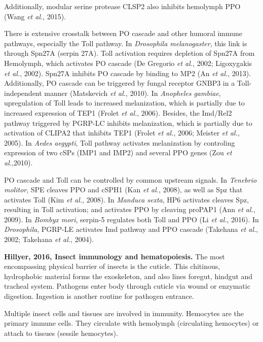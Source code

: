 \documentclass[11pt]{article}
\begin{document}
\begin{sloppypar}
Additionally, modular serine protease CLSP2 also inhibits hemolymph PPO (Wang \textit{et al.}, 2015).
\par
There is extensive crosstalk between PO cascade and other humoral immune pathways, especially the Toll pathway. 
In \textit{Drosophila melanogaster}, this link is through Spn27A (serpin 27A). 
Toll activation requires depletion of Spn27A from Hemolymph, which activates PO cascade (De Gregorio \textit{et al.}, 2002; Ligoxygakis \textit{et al.}, 2002). 
Spn27A inhibits PO cascade by binding to MP2 (An \textit{et al.}, 2013). 
Additionally, PO cascade can be triggered by fungal receptor GNBP3 in a Toll-independent manner (Matskevich \textit{et al.}, 2010). 
In \textit{Anopheles gambiae}, upregulation of Toll leads to increased melanization, which is partially due to increased expression of TEP1 (Frolet \textit{et al.}, 2006). 
Besides, the Imd/Rel2 pathway triggered by PGRP-LC inhibits melanization, which is partially due to activation of CLIPA2 that inhibits TEP1 (Frolet \textit{et al.}, 2006; Meister \textit{et al.}, 2005). 
In \textit{Aedes aegypti}, Toll pathway activates melanization by controling expression of two cSPs (IMP1 and IMP2) and several PPO genes (Zou \textit{et al.},2010).
\par
PO cascade and Toll can be controlled by common upstream signals. 
In \textit{Tenebrio molitor}, SPE cleaves PPO and cSPH1 (Kan \textit{et al.}, 2008), as well as Spz that activates Toll (Kim \textit{et al.}, 2008). 
In \textit{Manduca sexta}, HP6 activates cleaves Spz, resulting in Toll activation; and activates PPO by cleaving proPAP1 (Ann \textit{et al.}, 2009). 
In \textit{Bombyx mori}, serpin-5 regulates both Toll and PPO (Li \textit{et al.}, 2016). 
In \textit{Drosophila}, PGRP-LE activates Imd pathway and PPO cascade (Takehana \textit{et al.}, 2002; Takehana \textit{et al.}, 2004).
\par \newline \newline
\textbf{Hillyer, 2016, Insect immunology and hematopoiesis.}
The most encompassing physical barrier of insects is the cuticle. 
This chitinous, hydrophobic material forms the exoskeleton, and also lines foregut, hindgut and tracheal system. 
Pathogens enter body through cuticle via wound or enzymatic digestion. 
Ingestion is another routine for pathogen entrance. 
\par
Multiple insect cells and tissues are involved in immunity. 
Hemocytes are the primary immune cells. 
They circulate with hemolymph (circulating hemocytes) or attach to tissues (sessile hemocytes). 

\end{sloppypar}
\end{document}
